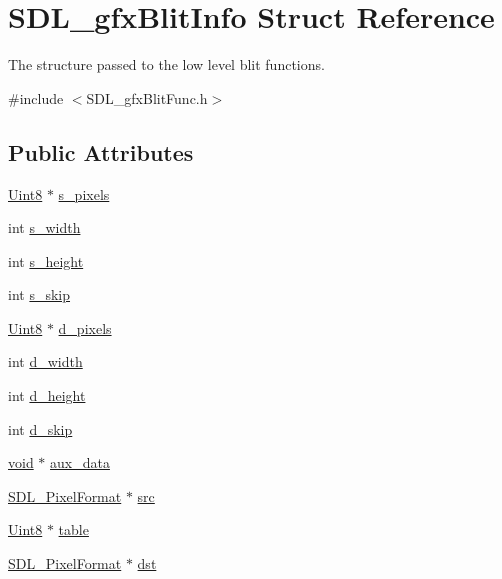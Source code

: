 \hypertarget{struct_s_d_l__gfx_blit_info}{}\section{S\+D\+L\+\_\+gfx\+Blit\+Info Struct Reference}
\label{struct_s_d_l__gfx_blit_info}


The structure passed to the low level blit functions.  




{\ttfamily \#include $<$S\+D\+L\+\_\+gfx\+Blit\+Func.\+h$>$}

\subsection*{Public Attributes}
\begin{DoxyCompactItemize}
\item 
\hyperlink{_s_d_l__stdinc_8h_a2944638813a090aa23e62f4da842c3e2}{Uint8} $\ast$ \hyperlink{struct_s_d_l__gfx_blit_info_afdacfb5c8054051bac7b21e3f99ee286}{s\+\_\+pixels}
\item 
int \hyperlink{struct_s_d_l__gfx_blit_info_a5af7fc9d6709cccb7317122b6461f4e0}{s\+\_\+width}
\item 
int \hyperlink{struct_s_d_l__gfx_blit_info_a71cc45d98329f686741c9ce6e6344ece}{s\+\_\+height}
\item 
int \hyperlink{struct_s_d_l__gfx_blit_info_a1e8f74883ce15abf766f0f9c1819c9b6}{s\+\_\+skip}
\item 
\hyperlink{_s_d_l__stdinc_8h_a2944638813a090aa23e62f4da842c3e2}{Uint8} $\ast$ \hyperlink{struct_s_d_l__gfx_blit_info_aabdef4377bb5ea77b332f9c450dfc80e}{d\+\_\+pixels}
\item 
int \hyperlink{struct_s_d_l__gfx_blit_info_a9275c2cce618daeb5094354e4dedb1fb}{d\+\_\+width}
\item 
int \hyperlink{struct_s_d_l__gfx_blit_info_aeaf23c44c5c05d890808056c607b1c62}{d\+\_\+height}
\item 
int \hyperlink{struct_s_d_l__gfx_blit_info_a361085f02fc05608dd54c35c92b9e1f0}{d\+\_\+skip}
\item 
\hyperlink{_s_d_l__opengl_8h_a3db05964a3cc4410f35b7ea2b7eb850d}{void} $\ast$ \hyperlink{struct_s_d_l__gfx_blit_info_adc4f6e914831474c0f9eb180f32bc8eb}{aux\+\_\+data}
\item 
\hyperlink{struct_s_d_l___pixel_format}{S\+D\+L\+\_\+\+Pixel\+Format} $\ast$ \hyperlink{struct_s_d_l__gfx_blit_info_a0af69b3969646f3b36d917ca8a6b63a0}{src}
\item 
\hyperlink{_s_d_l__stdinc_8h_a2944638813a090aa23e62f4da842c3e2}{Uint8} $\ast$ \hyperlink{struct_s_d_l__gfx_blit_info_a0aef408dbc6b41b08be7044539d2ffcc}{table}
\item 
\hyperlink{struct_s_d_l___pixel_format}{S\+D\+L\+\_\+\+Pixel\+Format} $\ast$ \hyperlink{struct_s_d_l__gfx_blit_info_a74e16caa4cd190e63571ba59d63c535e}{dst}
\end{DoxyCompactItemize}


